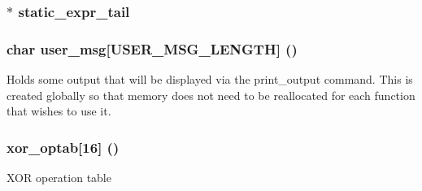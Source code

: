 \subsubsection{$\ast$ {\bf static\_\-expr\_\-tail}}\label{expr_8c_a9}


\subsubsection{\setlength{\rightskip}{0pt plus 5cm}char {\bf user\_\-msg}[USER\_\-MSG\_\-LENGTH] ()}\label{expr_8c_a7}


Holds some output that will be displayed via the print\_\-output command. This is created globally so that memory does not need to be reallocated for each function that wishes to use it. 
\subsubsection{ {\bf xor\_\-optab}[16] ()}\label{expr_8c_a0}


XOR operation table 